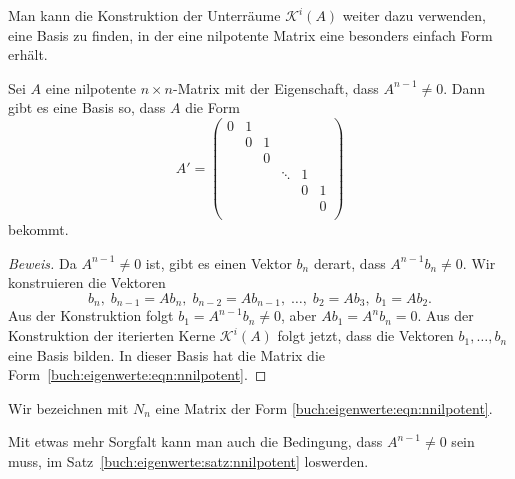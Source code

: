 Man kann die Konstruktion der Unterräume $\mathcal{K}^i(A)$ weiter
dazu verwenden, eine Basis zu finden, in der eine nilpotente Matrix
eine besonders einfach Form erhält.

\begin{satz}
\label{buch:eigenwerte:satz:nnilpotent}
Sei $A$ eine nilpotente $n\times n$-Matrix mit der Eigenschaft, dass
$A^{n-1}\ne 0$.
Dann gibt es eine Basis so, dass $A$ die Form
\begin{equation}
A'
=
\begin{pmatrix}
0&1& &      & & \\
 &0&1&      & & \\
 & &0&      & & \\
 & & &\ddots&1& \\
 & & &      &0&1\\
 & & &      & &0\\
\end{pmatrix}
\label{buch:eigenwerte:eqn:nnilpotent}
\end{equation}
bekommt.
\end{satz}

\begin{proof}[Beweis]
Da $A^{n-1}\ne 0$ ist, gibt es einen Vektor $b_n$ derart, dass $A^{n-1}b_n\ne0$.
Wir konstruieren die Vektoren
\[
b_n,\;
b_{n-1}=Ab_n,\;
b_{n-2}=Ab_{n-1},\;
\dots,\;
b_2=Ab_3,\;
b_1=Ab_2.
\]
Aus der Konstruktion folgt $b_1=A^{n-1}b_n\ne 0$, aber $Ab_1=A^nb_n=0$.
Aus der Konstruktion der iterierten Kerne $\mathcal{K}^i(A)$ folgt jetzt,
dass die Vektoren $b_1,\dots,b_n$ eine Basis bilden.
In dieser Basis hat die Matrix die Form~\ref{buch:eigenwerte:eqn:nnilpotent}.
\end{proof}

\begin{definition}
Wir bezeichnen mit $N_n$ eine Matrix der Form
\eqref{buch:eigenwerte:eqn:nnilpotent}.
\end{definition}

Mit etwas mehr Sorgfalt kann man auch die Bedingung, dass $A^{n-1}\ne 0$
sein muss, im Satz~\ref{buch:eigenwerte:satz:nnilpotent} loswerden.

